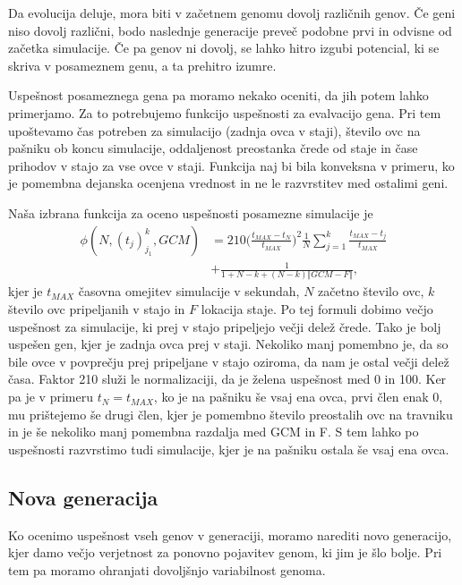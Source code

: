 Da evolucija deluje, mora biti v začetnem genomu dovolj različnih genov. Če geni niso dovolj različni, bodo naslednje generacije preveč podobne prvi in odvisne od začetka simulacije. Če pa genov ni dovolj, se lahko hitro izgubi potencial, ki se skriva v posameznem genu, a ta prehitro izumre.

Uspešnost posameznega gena pa moramo nekako oceniti, da jih potem lahko primerjamo. Za to potrebujemo funkcijo uspešnosti za evalvacijo gena. Pri tem upoštevamo čas potreben za simulacijo (zadnja ovca v staji), število ovc na pašniku ob koncu simulacije, oddaljenost preostanka črede od staje in čase prihodov v stajo za vse ovce v staji. Funkcija naj bi bila konveksna v primeru, ko je pomembna dejanska ocenjena vrednost in ne le razvrstitev med ostalimi geni.

Naša izbrana funkcija za oceno uspešnosti posamezne simulacije je
\begin{align}
\phi(N, (t_j)_{j_1}^k, GCM) &= 210\Big(\frac{t_{MAX} - t_N}{t_{MAX}}\Big)^2\frac{1}{N}\sum_{j=1}^k \frac{t_{MAX} - t_j}{t_{MAX}} \label{eq:genetski} \\
 &+ \frac{1}{1 + N - k + (N - k)\Vert GCM - F\Vert}, \nonumber
\end{align}
kjer je $t_{MAX}$ časovna omejitev simulacije v sekundah, $N$ začetno število ovc, $k$ število ovc pripeljanih v stajo in $F$ lokacija staje. Po tej formuli dobimo večjo uspešnost za simulacije, ki prej v stajo pripeljejo večji delež črede. Tako je bolj uspešen gen, kjer je zadnja ovca prej v staji. Nekoliko manj pomembno je, da so bile ovce v povprečju prej pripeljane v stajo oziroma, da nam je ostal večji delež časa. Faktor 210 služi le normalizaciji, da je želena uspešnost med 0 in 100. Ker pa je v primeru $t_N = t_{MAX}$, ko je na pašniku še vsaj ena ovca, prvi člen enak 0, mu prištejemo še drugi člen, kjer je pomembno število preostalih ovc na travniku in je še nekoliko manj pomembna razdalja med GCM in F. S tem lahko po uspešnosti razvrstimo tudi simulacije, kjer je na pašniku ostala še vsaj ena ovca.

\subsection{Nova generacija}

Ko ocenimo uspešnost vseh genov v generaciji, moramo narediti novo generacijo, kjer damo večjo verjetnost za ponovno pojavitev genom, ki jim je šlo bolje. Pri tem pa moramo ohranjati dovoljšnjo variabilnost genoma.


